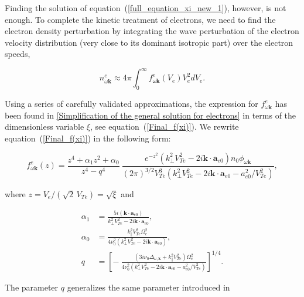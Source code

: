 \documentclass[draft]{agujournal2019}
\renewcommand{\vec}{\mathbf}
\begin{document}
Finding the solution of equation~(\ref{full_equation_xi_new_1}), however, is not enough. 
To complete the kinetic treatment of electrons, we need to find the electron
density perturbation by integrating the wave perturbation of the electron
velocity distribution (very close to its dominant isotropic part) over the electron speeds,
\begin{linenomath*}
\begin{equation}
n_{\omega\vec{k}}^{e}\approx4\pi\int_{0}^{\infty}f_{\omega\vec{k}}^{e}(V_{e})  V_{e}^{2}dV_{e}. 
\label{n^e_omega,k_via_f^e_omega,k}
\end{equation}
\end{linenomath*}
Using a series of carefully validated approximations, the expression for $f_{\omega\vec{k}}^{e}$ has been 
found in \ref{Simplification of the general solution for electrons} in terms of the 
dimensionless variable $\xi$, see equation~(\ref{Final_f(xi)}). We rewrite equation~(\ref{Final_f(xi)}) in the
following form:
\begin{linenomath*}
\begin{equation}
f_{\omega\vec{k}}^{e}(z)=\frac{z^{4}+\alpha_{1}z^{2}+\alpha_{0}}{z^{4}-q^{4}}
\ \frac{e^{-z^{2}}(k_{\perp}^{2}V_{Te}^{2}-2i\vec{k}\cdot\vec{a}
_{e0})  n_{0}\phi_{\omega\vec{k}}}{(2\pi)  ^{3/2}V_{Te}
^{3}(k_{\perp}^{2}V_{Te}^{2}-2i\vec{k}\cdot\vec{a}_{e0}-a_{e0}^{2}/V_{Te}^{2})},
\label{promka_2}
\end{equation}
\end{linenomath*}
where $z=V_e/(\sqrt{2}\,V_{Te})=\sqrt{\xi}$ %
and
\begin{linenomath*}
\begin{subequations}
\label{alpha_1,0;A}%
\begin{align}
\alpha_{1}  &  =\frac{5i(\vec{k}\cdot\vec{a}_{e0})
}{k_{\perp}^{2}V_{Te}^{2}-2i\vec{k}\cdot\vec{a}_{e0}},\label{alpha_1}\\
\alpha_{0}  &  =\frac{k_{\|}^{2}V_{Te}^{2}\Omega_{e}^{2}}{4\nu_{0}%
^{2}(k_{\perp}^{2}V_{Te}^{2}-2i\vec{k}\cdot\vec{a}_{e0})
},\label{alpha_0}\\
q  &  = \left[ -\ \frac{(3i\nu_{0}\Delta_{\omega,\vec{k}}+k_{\|}
^{2}V_{Te}^{2})  \Omega_{e}^{2}}{4\nu_{0}^{2}(k_{\perp}^{2}
V_{Te}^{2}-2i\vec{k}\cdot\vec{a}_{e0}-a_{e0}^{2}/V_{Te}^{2})}\right]^{1/4}. 
\label{A}
\end{align}
\end{subequations}
\end{linenomath*}
The parameter $q$ generalizes the same parameter introduced in 
\end{document}
